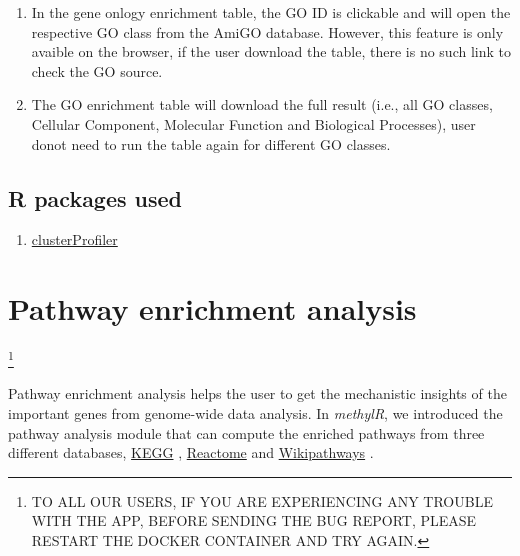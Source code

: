 \documentclass[
  a4paper,
  DIV=11,
  numbers=noendperiod,
  oneside,
  open=any]{scrreport}
\providecommand{\tightlist}{%
  \setlength{\itemsep}{0pt}\setlength{\parskip}{0pt}}\usepackage{longtable,booktabs,array}
\begin{document}
\begin{tcolorbox}[enhanced jigsaw, opacityback=0, toprule=.15mm, bottomtitle=1mm, colback=white, rightrule=.15mm, breakable, coltitle=black, colbacktitle=quarto-callout-warning-color!10!white, toptitle=1mm, arc=.35mm, colframe=quarto-callout-warning-color-frame, bottomrule=.15mm, opacitybacktitle=0.6, titlerule=0mm, leftrule=.75mm, title=\textcolor{quarto-callout-warning-color}{\faExclamationTriangle}\hspace{0.5em}{Warning}, left=2mm]

\begin{enumerate}
\def\labelenumi{\arabic{enumi}.}
\tightlist
\item
  In the gene onlogy enrichment table, the GO ID is clickable and will
  open the respective GO class from the AmiGO database. However, this
  feature is only avaible on the browser, if the user download the
  table, there is no such link to check the GO source.
\item
  The GO enrichment table will download the full result (i.e., all GO
  classes, Cellular Component, Molecular Function and Biological
  Processes), user donot need to run the table again for different GO
  classes.
\end{enumerate}

\end{tcolorbox}

\section{R packages used}\label{r-packages-used-4}

\begin{enumerate}
\def\labelenumi{\arabic{enumi}.}
\tightlist
\item
  \href{https://bioconductor.org/packages/release/bioc/vignettes/clusterProfiler/inst/doc/clusterProfiler.html}{clusterProfiler}
\end{enumerate}

\chapter{Pathway enrichment analysis}\label{sec-pathway}

\footnote{TO ALL OUR USERS, IF YOU ARE EXPERIENCING ANY TROUBLE WITH THE
  APP, BEFORE SENDING THE BUG REPORT, PLEASE RESTART THE DOCKER
  CONTAINER AND TRY AGAIN.}

Pathway enrichment analysis helps the user to get the mechanistic
insights of the important genes from genome-wide data analysis. In
\emph{methylR}, we introduced the pathway analysis module that can
compute the enriched pathways from three different databases,
\href{https://www.genome.jp/kegg/}{KEGG} \autocite{Kanehisa2000},
\href{https://reactome.org/}{Reactome} \autocite{Gillespie2021} and
\href{https://www.wikipathways.org/}{Wikipathways}
\autocite{pico2008plos,martens2020nar}.
\end{document}
